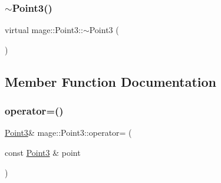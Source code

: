 \hypertarget{structmage_1_1_point3_a6bdc329ad2ec6f812a2b7ed1d153b54b}{}\label{structmage_1_1_point3_a6bdc329ad2ec6f812a2b7ed1d153b54b} 
\subsubsection{\texorpdfstring{$\sim$\+Point3()}{~Point3()}}
{\footnotesize\ttfamily virtual mage\+::\+Point3\+::$\sim$\+Point3 (\begin{DoxyParamCaption}{ }\end{DoxyParamCaption})\hspace{0.3cm}{\ttfamily [virtual]}}



\subsection{Member Function Documentation}
\hypertarget{structmage_1_1_point3_a53403b16c67a6c7d72910edaec04e371}{}\label{structmage_1_1_point3_a53403b16c67a6c7d72910edaec04e371} 
\subsubsection{\texorpdfstring{operator=()}{operator=()}}
{\footnotesize\ttfamily \hyperlink{structmage_1_1_point3}{Point3}\& mage\+::\+Point3\+::operator= (\begin{DoxyParamCaption}\item[{const \hyperlink{structmage_1_1_point3}{Point3} \&}]{point }\end{DoxyParamCaption})}

